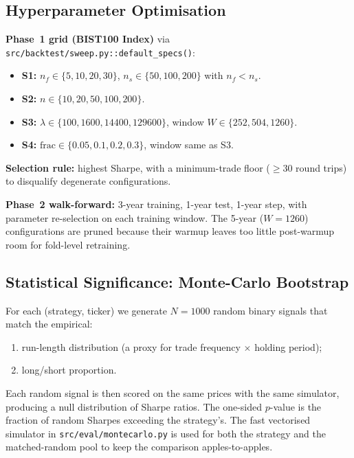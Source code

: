 \documentclass[11pt,a4paper]{article}
\begin{document}
\subsection{Hyperparameter Optimisation}\label{sec:opt}

\textbf{Phase~1 grid (BIST100 Index)} via
\texttt{src/backtest/sweep.py::default\_specs()}:
\begin{itemize}[leftmargin=1.5em,itemsep=2pt]
    \item \textbf{S1:} $n_f\!\in\!\{5,10,20,30\}$, $n_s\!\in\!\{50,100,200\}$ with $n_f<n_s$.
    \item \textbf{S2:} $n\!\in\!\{10,20,50,100,200\}$.
    \item \textbf{S3:} $\lambda\!\in\!\{100, 1600, 14400, 129600\}$,
          window $W\!\in\!\{252,504,1260\}$.
    \item \textbf{S4:} $\text{frac}\!\in\!\{0.05, 0.1, 0.2, 0.3\}$,
          window same as S3.
\end{itemize}
\textbf{Selection rule:} highest Sharpe, with a minimum-trade floor
($\ge 30$ round trips) to disqualify degenerate configurations.

\textbf{Phase~2 walk-forward:} 3-year training, 1-year test, 1-year step, with
parameter re-selection on each training window. The 5-year ($W=1260$)
configurations are pruned because their warmup leaves too little post-warmup
room for fold-level retraining.

\subsection{Statistical Significance: Monte-Carlo Bootstrap}\label{sec:mc}

For each (strategy, ticker) we generate $N=1000$ random binary signals that
match the empirical:
\begin{enumerate}[leftmargin=1.5em,itemsep=2pt]
    \item run-length distribution (a proxy for trade frequency $\times$
          holding period);
    \item long/short proportion.
\end{enumerate}
Each random signal is then scored on the same prices with the same simulator,
producing a null distribution of Sharpe ratios. The one-sided $p$-value is the
fraction of random Sharpes exceeding the strategy's. The fast vectorised
simulator in \texttt{src/eval/montecarlo.py} is used for both the strategy and
the matched-random pool to keep the comparison apples-to-apples.
\end{document}
